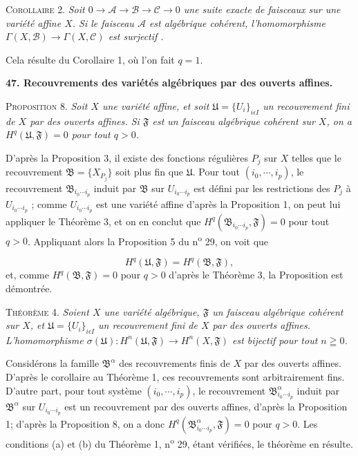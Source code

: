 \textsc{Corollaire} 2. \textit{Soit $0 \to \mathcal{A} \to \mathcal{B} \to \mathcal{C} \to 0$ une suite exacte de faisceaux sur une variété affine $X$. Si le faisceau $\mathcal{A}$ est algébrique cohérent, l'homomorphisme $\Gamma(X, \mathcal{B}) \to \Gamma(X, \mathcal{C})$ est surjectif .}

Cela résulte du Corollaire 1, où l'on fait $q = 1$.


\textbf{47. Recouvrements des variétés algébriques par des ouverts affines.}

\textsc{Proposition} 8. \textit{Soit $X$ une variété affine, et soit $\mathfrak{U} = \{U_i\}_{i \epsilon I}$ un recouvrement fini de $X$ par des ouverts affines. Si $\mathfrak{F}$ est un faisceau algébrique cohérent sur $X$, on a $H^q(\mathfrak{U}, \mathfrak{F}) = 0$ pour tout $q > 0$.}

D'après la Proposition 3, il existe des fonctions régulières $P_j$ sur $X$ telles que le recouvrement $\mathfrak{B} = \{X_{P_j}\}$ soit plus fin que $\mathfrak{U}$. Pour tout $(i_0 , \cdots , i_p)$, le recouvrement $\mathfrak{B}_{i_0 \cdots i_p}$ induit par $\mathfrak{B}$ sur $U_{i_0 \cdots i_p}$ est défini par les restrictions des $P_j$ à $U_{i_0 \cdots i_p}$ ; comme $U_{i_0 \cdots i_p}$ est une variété affine d'après la Proposition 1, on peut lui appliquer le Théorème 3, et on en conclut que $H^q(\mathfrak{B}_{i_0 \cdots i_p} , \mathfrak{F}) = 0$ pour tout $q > 0$. Appliquant alors la Proposition 5 du n\textsuperscript{o} 29, on voit que

\begin{equation*}
H^q(\mathfrak{U}, \mathfrak{F}) = H^q(\mathfrak{B}, \mathfrak{F}),
\end{equation*}
et, comme $H^q(\mathfrak{B}, \mathfrak{F}) = 0$ pour $q > 0$ d'après le Théorème 3, la Proposition est démontrée.

\textsc{Théorème} 4. \textit{Soient $X$ une variété algébrique, $\mathfrak{F}$ un faisceau algébrique cohérent sur $X$, et $\mathfrak{U} = \{U_i\}_{i \epsilon I}$ un recouvrement fini de $X$ par des ouverts affines. L'homomorphisme $\sigma(\mathfrak{U}) : H^n(\mathfrak{U}, \mathfrak{F}) \to H^n(X, \mathfrak{F})$ est bijectif pour tout $n \geqq 0$.}

Considérons la famille $\mathfrak{B}^\alpha$ des recouvrements finis de $X$ par des ouverts affines. D'après le corollaire au Théorème 1, ces recouvrements sont arbitrairement fins. D'autre part, pour tout système $(i_0 , \cdots , i_p)$, le recouvrement $\mathfrak{B}^\alpha_{i_0 \cdots i_p}$ induit par $\mathfrak{B}^\alpha$ sur $U_{i_0 \cdots i_p}$ est un recouvrement par des ouverts affines, d'après la Proposition 1; d'après la Proposition 8, on a donc $H^q(\mathfrak{B}^\alpha_{i_0 \cdots i_p} , \mathfrak{F}) = 0$ pour $q > 0$. Les conditions (a) et (b) du Théorème 1, n\textsuperscript{o} 29, étant vérifiées, le théorème en résulte.

